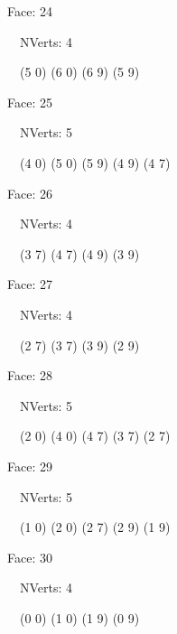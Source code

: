 \documentclass{article}
\begin{document}
{\footnotesize 

Face: 24

\   \    NVerts: 4

 \   \   (5 0) (6 0) (6 9) (5 9)}

{\footnotesize 

Face: 25

\   \    NVerts: 5

 \   \   (4 0) (5 0) (5 9) (4 9) (4 7)}

{\footnotesize 

Face: 26

\   \    NVerts: 4

 \   \   (3 7) (4 7) (4 9) (3 9)}

{\footnotesize 

Face: 27

\   \    NVerts: 4

 \   \   (2 7) (3 7) (3 9) (2 9)}

{\footnotesize 

Face: 28

\   \    NVerts: 5

 \   \   (2 0) (4 0) (4 7) (3 7) (2 7)}

{\footnotesize 

Face: 29

\   \    NVerts: 5

 \   \   (1 0) (2 0) (2 7) (2 9) (1 9)}

{\footnotesize 

Face: 30

\   \    NVerts: 4

 \   \   (0 0) (1 0) (1 9) (0 9)}


 \newpage
\end{document}
